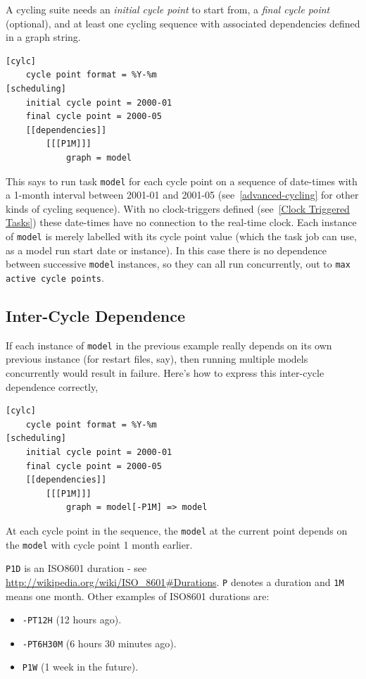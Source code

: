 A cycling suite needs an {\em initial cycle point} to start from, 
a {\em final cycle point} (optional), and at least one cycling sequence with associated
dependencies defined in a graph string.

\begin{lstlisting}[language=suiterc]
[cylc]
    cycle point format = %Y-%m
[scheduling]
    initial cycle point = 2000-01
    final cycle point = 2000-05
    [[dependencies]]
        [[[P1M]]]
            graph = model
\end{lstlisting}

This says to run task \lstinline=model= for each cycle point on
a sequence of date-times with a 1-month interval between 2001-01 and 2001-05 
(see~\ref{advanced-cycling} for other kinds of cycling sequence).
With no clock-triggers defined (see~\ref{Clock Triggered Tasks}) these
date-times have no connection to the real-time clock.  Each instance of
\lstinline=model= is merely labelled with its cycle point value (which the task
job can use, as a model run start date or instance).  In this case
there is no dependence between successive \lstinline=model= instances, so they
can all run concurrently, out to \lstinline=max active cycle points=.

\subsection{Inter-Cycle Dependence}

If each instance of \lstinline=model= in the previous example really depends
on its own previous instance (for restart files, say), then running multiple
models concurrently would result in failure.  Here's how to express this
inter-cycle dependence correctly,

\begin{lstlisting}[language=suiterc]
[cylc]
    cycle point format = %Y-%m
[scheduling]
    initial cycle point = 2000-01
    final cycle point = 2000-05
    [[dependencies]]
        [[[P1M]]]
            graph = model[-P1M] => model
\end{lstlisting}
At each cycle point in the sequence, the \lstinline=model= at the current point
depends on the \lstinline=model= with cycle point 1 month earlier.

\lstinline=P1D= is an ISO8601 duration - see
    \url{http://wikipedia.org/wiki/ISO_8601#Durations}. \lstinline=P= denotes a
    duration and \lstinline=1M= means one month. Other examples of ISO8601
    durations are:
\begin{itemize}
    \item \lstinline{-PT12H} (12 hours ago).
    \item \lstinline{-PT6H30M} (6 hours 30 minutes ago).
    \item \lstinline{P1W} (1 week in the future).
\end{itemize}

